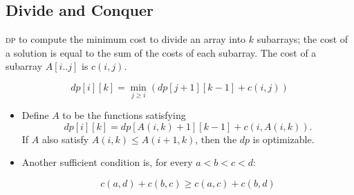 \subsection{Divide and Conquer}

\textsc{dp} to compute the minimum cost to divide an array into $k$ subarrays; the cost of a solution is equal to the sum of the costs of each subarray. The cost of a subarray $A[i..j]$ is $c(i, j)$.

$$dp[i][k] = \min_{j \ge i} \left( dp[j+1][k-1] + c(i, j) \right)$$

\begin{itemize}
    \item  Define $A$ to be the functions satisfying
    $$dp[i][k] = dp[A(i, k) + 1][k-1] + c(i, A(i, k)).$$
    If $A$ also satisfy $A(i, k) \le A(i+1, k)$, then the $dp$ is optimizable.

    \item Another sufficient condition is, for every $a < b < c < d$:

    $$ c(a, d) + c(b, c) \geq c(a, c) + c(b, d) $$
\end{itemize}

